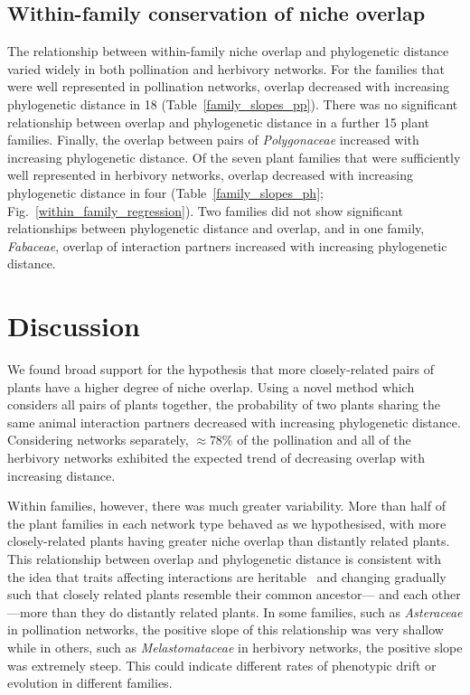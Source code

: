 \documentclass[12pt]{article}
\begin{document}
\begin{spacing}{1.5}
  \subsection*{Within-family conservation of niche overlap}

    The relationship between within-family niche overlap and phylogenetic distance
    varied widely in both pollination and herbivory networks. For the families
    that were well represented in pollination networks, overlap decreased
    with increasing phylogenetic distance in 18 (Table~\ref{family_slopes_pp}).
    There was no significant relationship between overlap and phylogenetic distance in
    a further 15 plant families. Finally, the overlap between pairs of \emph{Polygonaceae}
    increased with increasing phylogenetic distance. 
    Of the seven plant families that were sufficiently well represented in herbivory 
    networks, overlap decreased with increasing phylogenetic distance in four 
    (Table~\ref{family_slopes_ph}; Fig.~\ref{within_family_regression}). Two
    families did not show significant relationships between phylogenetic distance and overlap,
    and in one family, \emph{Fabaceae}, overlap of interaction partners increased with 
    increasing phylogenetic distance.


\section*{Discussion}

  We found broad support for the hypothesis that more
  closely-related pairs of plants have a higher degree
  of niche overlap. Using a novel method which considers
  all pairs of plants together, 
  the probability of two plants sharing the same animal 
  interaction partners decreased with increasing 
  phylogenetic distance. Considering networks separately,
  $\approx$78\%  of the pollination and all of the 
  herbivory networks exhibited the expected trend of decreasing 
  overlap with increasing distance. 


  Within families, however, there was much greater variability. 
  More than half of the plant families in each network type
  behaved as we hypothesised, with more 
  closely-related plants having greater niche overlap than 
  distantly related plants. This relationship between overlap and 
  phylogenetic distance is consistent with the idea that traits affecting 
  interactions are heritable~\citep{Schemske1999} and changing gradually
  such that closely related plants resemble their common ancestor--- and
  each other ---more than they do distantly related plants. In some families, 
  such as \emph{Asteraceae} in pollination networks, the positive slope of 
  this relationship was very shallow while in others, such as 
  \emph{Melastomataceae} in herbivory networks, the positive slope was 
  extremely steep. This could indicate different rates of phenotypic drift 
  or evolution in different families.



\end{spacing}
\end{document}
